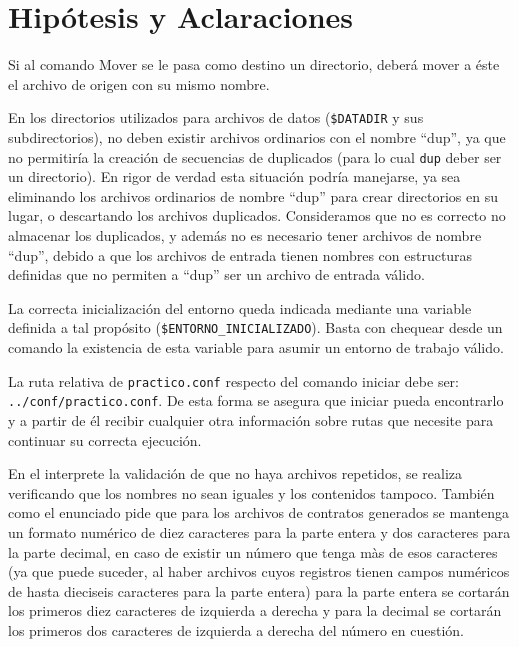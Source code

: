 \documentclass[12pt]{article}
\begin{document}
\tableofcontents
\thispagestyle{empty}
\clearpage

\section{Hipótesis y Aclaraciones}

Si al comando Mover se le pasa como destino un directorio, deberá mover a éste el archivo de origen con su mismo nombre.

En los directorios utilizados para archivos de datos (\verb|$DATADIR| y sus subdirectorios), no deben existir archivos ordinarios con el nombre ``dup'', ya que no permitiría la creación de secuencias de duplicados (para lo cual \verb|dup| deber ser un directorio). 
En rigor de verdad esta situación podría manejarse, ya sea eliminando los archivos ordinarios de nombre ``dup'' para crear directorios en su lugar, o descartando los archivos duplicados. 
Consideramos que no es correcto no almacenar los duplicados, y además no es necesario tener archivos de nombre ``dup'', debido a que los archivos de entrada tienen nombres con estructuras definidas que no permiten a ``dup'' ser un archivo de entrada válido.

La correcta inicialización del entorno queda indicada mediante una variable definida a tal propósito (\verb|$ENTORNO_INICIALIZADO|). Basta con chequear desde un comando la existencia de esta variable para asumir un entorno de trabajo válido.

La ruta relativa de \verb|practico.conf| respecto del comando iniciar debe ser: \verb|../conf/practico.conf|. De esta forma se asegura que iniciar pueda encontrarlo y a partir de él recibir cualquier otra información sobre rutas que necesite para continuar su correcta ejecución.

En el interprete la validación de que no haya archivos repetidos, se realiza verificando que los nombres no sean iguales y los contenidos tampoco. También como el enunciado pide que para los archivos de contratos generados se mantenga un formato numérico de diez caracteres para la parte entera y dos caracteres para la parte decimal, en caso de existir un número que tenga màs de esos caracteres (ya que puede suceder, al haber archivos cuyos registros tienen campos numéricos de hasta dieciseis caracteres para la parte entera) para la parte entera se cortarán los primeros diez caracteres de izquierda a derecha y para la decimal se cortarán los primeros dos caracteres de izquierda a derecha del número en cuestión.
\end{document}
